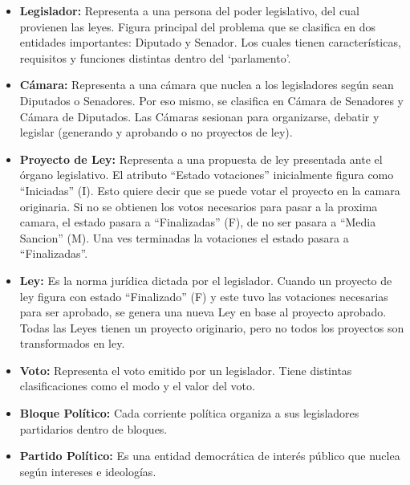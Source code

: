 \begin{itemize}
\item \textbf{Legislador: } Representa a una persona del poder legislativo, del cual provienen las leyes. Figura principal del problema que se clasifica en dos entidades importantes: Diputado y Senador. Los cuales tienen caracter\'isticas, requisitos y funciones distintas dentro del \lq parlamento\rq . 

\quad 

\item \textbf{C\'amara: } Representa a una c\'amara que nuclea a los legisladores seg\'un sean Diputados o Senadores. Por eso mismo, se clasifica en C\'amara de Senadores y C\'amara de Diputados. Las C\'amaras sesionan para organizarse, debatir y legislar (generando y aprobando o no proyectos de ley).

\quad

\item \textbf{Proyecto de Ley: } Representa a una propuesta de ley presentada ante el \'organo legislativo. El atributo ``Estado votaciones'' inicialmente figura como ``Iniciadas'' (I). Esto quiere decir que se puede votar el proyecto en la camara originaria. Si no se obtienen los votos necesarios para pasar a la proxima camara, el estado pasara a ``Finalizadas'' (F), de no ser pasara a ``Media Sancion'' (M). Una ves terminadas la votaciones el estado pasara a ``Finalizadas''.

\quad

\item \textbf{Ley: } Es la norma jur\'idica dictada por el legislador. Cuando un proyecto de ley figura con estado ``Finalizado'' (F) y este tuvo las votaciones necesarias para ser aprobado, se genera una nueva Ley en base al proyecto aprobado. Todas las Leyes tienen un proyecto originario, pero no todos los proyectos son transformados en ley.

\quad

\item \textbf{Voto: } Representa el voto emitido por un legislador. Tiene distintas clasificaciones como el modo y el valor del voto.

\quad

\item \textbf{Bloque Pol\'itico: } Cada corriente pol\'itica organiza a sus legisladores partidarios dentro de bloques.

\quad

\item \textbf{Partido Pol\'itico: } Es una entidad democr\'atica de inter\'es p\'ublico que nuclea seg\'un intereses e ideolog\'ias. 


\end{itemize}

